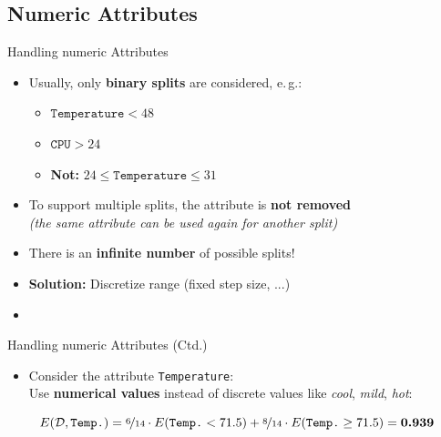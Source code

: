 \subsection{Numeric Attributes}

\begin{frame}{Handling numeric Attributes}{}
	\begin{itemize}
		\item Usually, only \textbf{binary splits} are considered, e.\,g.:
		\begin{itemize}
			\item $\texttt{Temperature} < 48$
			\item $\texttt{CPU} > 24$
			\item \textbf{Not:} $24 \le \texttt{Temperature} \le 31$
		\end{itemize}
		\item To support multiple splits, the attribute is \textbf{not removed} \\
			{\footnotesize \textit{(the same attribute can be used again for another split)}}
		\item {} There is an \textbf{infinite number} of possible splits!
		\item \textbf{Solution:} Discretize range (fixed step size, ...)
		\item {}
	\end{itemize}
\end{frame}


\begin{frame}{Handling numeric Attributes (Ctd.)}{}\important
	\begin{itemize}
		\item Consider the attribute \texttt{Temperature}: \\
			Use \textbf{numerical values} instead of discrete values like \textit{cool}, \textit{mild}, \textit{hot}:
	\end{itemize}
	\vspace*{-3mm}
	
	\vspace*{2mm}
	\begin{equation*}
			E(\mathcal{D}, \texttt{Temp.})
				= \nicefrac{6}{14} \cdot E(\texttt{Temp.} < 71.5) + \nicefrac{8}{14} \cdot E(\texttt{Temp.} \ge 71.5)
				= \bm{0.939}
		\end{equation*}
\end{frame}


